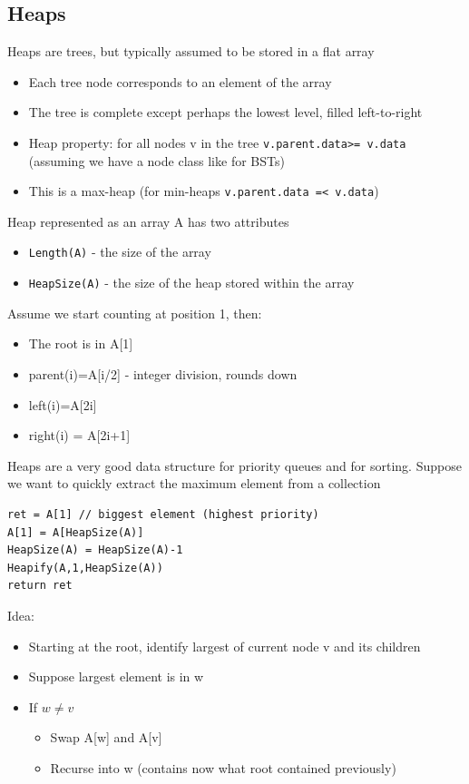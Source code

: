\documentclass{article}[18pt]
\begin{document}
\subsection{Heaps}
Heaps are trees, but typically assumed to be stored in a flat array
\begin{itemize}
	\item Each tree node corresponds to an element of the array
	\item The tree is complete except perhaps the lowest level, filled left-to-right
	\item Heap property: for all nodes v in the tree \texttt{v.parent.data>= v.data} (assuming we have a node class like for BSTs)
	\item This is a max-heap (for min-heaps \texttt{v.parent.data =< v.data})
\end{itemize}
Heap represented as an array A has two attributes
\begin{itemize}
	\item \texttt{Length(A)} - the size of the array
	\item \texttt{HeapSize(A)} - the size of the heap stored within the array
\end{itemize}
Assume we start counting at position 1, then:
\begin{itemize}
	\item The root is in A[1]
	\item parent(i)=A[i/2] - integer division, rounds down
	\item left(i)=A[2i]
	\item right(i) = A[2i+1]
\end{itemize}
Heaps are a very good data structure for priority queues and for sorting. Suppose we want to quickly extract the maximum element from a collection
\begin{lstlisting}[caption=HeapExtractMax(A)]
ret = A[1] // biggest element (highest priority)
A[1] = A[HeapSize(A)]
HeapSize(A) = HeapSize(A)-1
Heapify(A,1,HeapSize(A))
return ret
\end{lstlisting}
Idea:
\begin{itemize}
	\item Starting at the root, identify largest of current node v and its children
	\item Suppose largest element is in w
	\item If $w\neq v$
	\begin{itemize}
		\item Swap A[w] and A[v]
		\item Recurse into w (contains now what root contained previously)
	\end{itemize}
\end{itemize}
\end{document}
